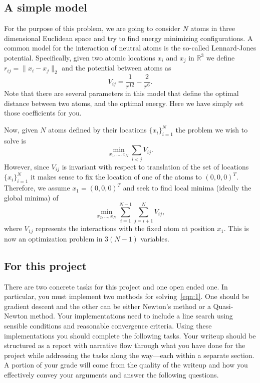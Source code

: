 \documentclass[11pt,onecolumn]{article}
\begin{document}
\subsection*{A simple model}

For the purpose of this problem, we are going to consider $N$ atoms in three dimensional Euclidean space and try to find energy minimizing configurations. A common model for the interaction of neutral atoms is the so-called Lennard-Jones potential. Specifically, given two atomic locations $x_i$ and $x_j$ in $\mathbb{R}^3$ we define $r_{ij} = \|x_i-x_j\|_2$ and the potential between atoms as 
\[
V_{ij} = \frac{1}{r^{12}} - \frac{2}{r^6}.
\]
Note that there are several parameters in this model that define the optimal distance between two atoms, and the optimal energy. Here we have simply set those coefficients for you.

Now, given $N$ atoms defined by their locations $\{x_i\}_{i=1}^N$ the problem we wish to solve is 
\[
\min_{x_1,\ldots,x_N} \sum_{i<j} V_{ij}.
\]
However, since $V_{ij}$ is invariant with respect to translation of the set of locations $\{x_i\}_{i=1}^N$ it makes sense to fix the location of one of the atoms to $(0, 0, 0)^T.$ Therefore, we assume $x_1 = (0, 0, 0)^T$ and seek to find local minima (ideally the global minima) of
\begin{equation}
\min_{x_2,\ldots,x_N} \sum_{i=1}^{N-1}\sum_{j=i+1}^{N} V_{ij},
\label{eqn:1}
\end{equation}
where $V_{1j}$ represents the interactions with the fixed atom at position $x_1.$ This is now an optimization problem in $3(N-1)$ variables.

\subsection*{For this project}
There are two concrete tasks for this project and one open ended one. In particular, you must implement two methods for solving~\eqref{eqn:1}. One should be gradient descent and the other can be either Newton's method or a Quasi-Newton method. Your implementations need to include a line search using sensible conditions and reasonable convergence criteria. Using these implementations you should complete the following tasks. Your writeup should be structured as a report with narrative flow through what you have done for the project while addressing the tasks along the way---each within a separate section. A portion of your grade will come from the quality of the writeup and how you effectively convey your arguments and answer the following questions.
\end{document}
